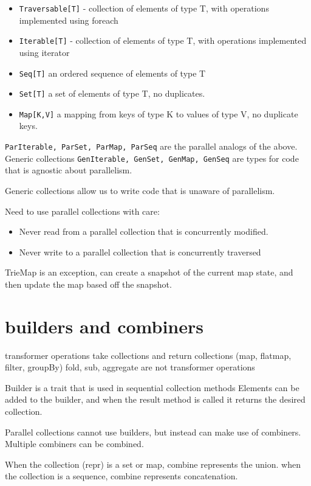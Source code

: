 \begin{itemize}
    \item \lstinline|Traversable[T]| - collection of elements of type T, with operations implemented using foreach
    \item \lstinline|Iterable[T]| - collection of elements of type T, with operations implemented using iterator
    \item \lstinline|Seq[T]| an ordered sequence of elements of type T
    \item \lstinline|Set[T]| a set of elements of type T, no duplicates.
    \item \lstinline|Map[K,V]| a mapping from keys of type K to values of type V, no duplicate keys.
\end{itemize}

\lstinline|ParIterable, ParSet, ParMap, ParSeq| are the parallel analogs of the above.
Generic collections \lstinline|GenIterable, GenSet, GenMap, GenSeq| are types for code that is agnostic about parallelism.

Generic collections allow us to write code that is unaware of parallelism.

Need to use parallel collections with care:
\begin{itemize}
    \item Never read from a parallel collection that is concurrently modified.
    \item Never write to a parallel collection that is concurrently traversed
\end{itemize}
TrieMap is an exception, can create a snapshot of the current map state, and then update the map based off the snapshot.

\section{ builders and combiners}
transformer operations take collections and return collections (map, flatmap, filter, groupBy)
fold, sub, aggregate are not transformer operations

Builder is a trait that is used in sequential collection methods
Elements can be added to the builder, and when the result method is called it returns the desired collection.

Parallel collections cannot use builders, but instead can make use of combiners. Multiple combiners can be combined.

When the collection (repr) is a set or map, combine represents the union.
when the collection is a sequence, combine represents concatenation.


